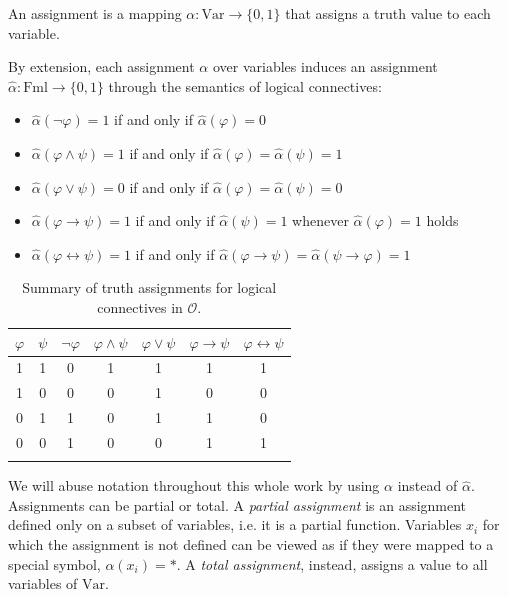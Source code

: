 \begin{definition}
  An assignment is a mapping $\alpha : \mathrm{Var} \to \{0,1\}$ that assigns a truth value to each variable.
\end{definition}

By extension, each assignment $\alpha$ over variables induces an assignment $\widehat{\alpha} : \mathrm{Fml} \to \{0,1\}$ through the semantics of logical connectives:
  \begin{itemize}
    \item $\widehat{\alpha}(\lnot \varphi) = 1$ if and only if $\widehat{\alpha}(\varphi) = 0$
    \item $\widehat{\alpha}(\varphi \land \psi) = 1$ if and only if $\widehat{\alpha}(\varphi) = \widehat{\alpha}(\psi) = 1$
    \item $\widehat{\alpha}(\varphi \lor \psi) = 0$ if and only if $\widehat{\alpha}(\varphi) = \widehat{\alpha}(\psi) = 0$
    \item $\widehat{\alpha}(\varphi \to \psi) = 1$ if and only if $\widehat{\alpha}(\psi) = 1$ whenever $\widehat{\alpha}(\varphi) = 1$ holds
    \item $\widehat{\alpha}(\varphi \leftrightarrow \psi) = 1$ if and only if $\widehat{\alpha}(\varphi \to \psi) = \widehat{\alpha}(\psi \to \varphi) = 1$
  \end{itemize}

\begin{table}
  \centering
  \begin{tabular}{cc|ccccc}
    \toprule
    $ \varphi $ & $ \psi $ & $ \neg \varphi $ & $ \varphi \land \psi $ & $ \varphi \lor \psi $ & $ \varphi \rightarrow \psi $ & $ \varphi \leftrightarrow \psi $ \\
    \midrule
    1 & 1 & 0 & 1 & 1 & 1 & 1 \\
    1 & 0 & 0 & 0 & 1 & 0 & 0 \\
    0 & 1 & 1 & 0 & 1 & 1 & 0 \\
    0 & 0 & 1 & 0 & 0 & 1 & 1 \\
    \bottomrule\\
  \end{tabular}
  \caption{Summary of truth assignments for logical connectives in $\mathscr{O}$.}
  \label{tab:propositional_truth_table}
\end{table}

We will abuse notation throughout this whole work by using $\alpha$ instead of $\widehat{\alpha}$. Assignments can be partial or total. A \textit{partial assignment} is an assignment defined only on a subset of variables, i.e. it is a partial function. Variables $x_i$ for which the assignment is not defined can be viewed as if they were mapped to a special symbol, $\alpha(x_i) = *$. A \textit{total assignment}, instead, assigns a value to all variables of $\mathrm{Var}$.

